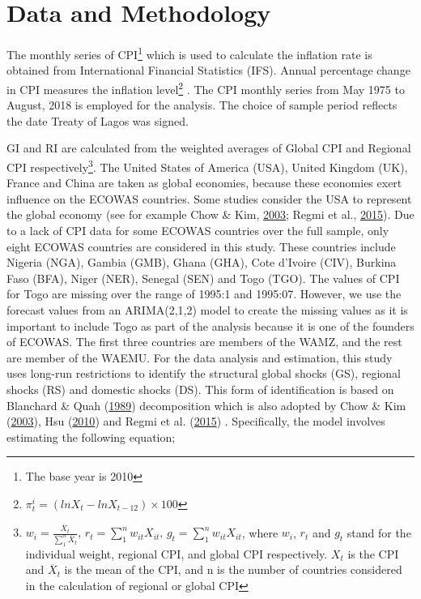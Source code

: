 \documentclass[]{article}
\let\rmarkdownfootnote\footnote%
\def\footnote{\protect\rmarkdownfootnote}
\begin{document}
\hypertarget{data-and-methodology}{%
\section{Data and Methodology}\label{data-and-methodology}}

The monthly series of  \ac{CPI}\footnote{The base year is 2010} which is used to calculate the inflation rate is obtained from International Financial Statistics (IFS). Annual percentage change in CPI measures the inflation level\footnote{\(π_t^i=(lnX_t-lnX_{t-12}) \times 100\)} . The CPI monthly series from May 1975 to August, 2018 is employed for the analysis. The choice of sample period reflects the date Treaty of Lagos was signed.

\ac{GI} and  \ac{RI} are calculated from the weighted averages of Global CPI and Regional CPI respectively\footnote{\(w_{i}=\frac{\overline{X}_t}{\sum_{1}^{n}\overline{X}_t} \text{, } r_t=\sum_1^nw_{it}X_{it}\text{, } g_t=\sum_1^nw_{it}X_{it}\), where \(w_i\), \(r_t\) and \(g_t\) stand for the individual weight, regional CPI, and global CPI respectively. \(X_t\) is the CPI and \(\overline{X}_t\) is the mean of the CPI, and n is the number of countries considered in the calculation of regional or global CPI}. The United States of America (USA), United Kingdom (UK), France and China are taken as global economies, because these economies exert influence on the ECOWAS countries. Some studies consider the USA to represent the global economy (see for example Chow \& Kim, \protect\hyperlink{ref-Chow2003}{2003}; Regmi et al., \protect\hyperlink{ref-Regmi2015}{2015}). Due to a lack of CPI data for some ECOWAS countries over the full sample, only eight ECOWAS countries are considered in this study. These countries include Nigeria (NGA), Gambia (GMB), Ghana (GHA), Cote d'Ivoire (CIV), Burkina Faso (BFA), Niger (NER), Senegal (SEN) and Togo (TGO). The values of CPI for Togo are missing over the range of 1995:1 and 1995:07. However, we use the forecast values from an ARIMA(2,1,2) model to create the missing values as it is important to include Togo as part of the analysis because it is one of the founders of ECOWAS. The first three countries are members of the WAMZ, and the rest are member of the WAEMU.
For the data analysis and estimation, this study uses long-run restrictions to identify the structural global shocks (GS), regional shocks (RS) and domestic shocks (DS). This form of identification is based on Blanchard \& Quah (\protect\hyperlink{ref-Blanchard1989}{1989}) decomposition which is also adopted by Chow \& Kim (\protect\hyperlink{ref-Chow2003}{2003}), Hsu (\protect\hyperlink{ref-hsu2010common}{2010}) and Regmi et al. (\protect\hyperlink{ref-Regmi2015}{2015}) . Specifically, the model involves estimating the following equation;
\end{document}
